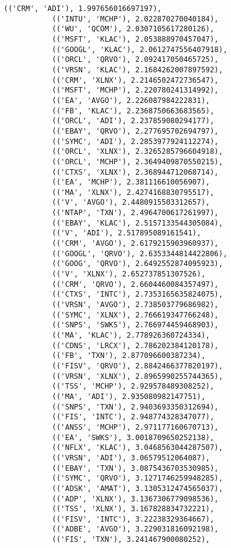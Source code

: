 \documentclass[11pt]{article}
\begin{document}
\begin{Verbatim}[commandchars=\\\{\}]
           (('CRM', 'ADI'), 1.997656016697197),
           (('INTU', 'MCHP'), 2.022870270040184),
           (('WU', 'QCOM'), 2.0307105617280126),
           (('MSFT', 'KLAC'), 2.053888970457047),
           (('GOOGL', 'KLAC'), 2.0612747556407918),
           (('ORCL', 'QRVO'), 2.092417050465725),
           (('VRSN', 'KLAC'), 2.1684262007897592),
           (('CRM', 'XLNX'), 2.2146502472736547),
           (('MSFT', 'MCHP'), 2.220780241314992),
           (('EA', 'AVGO'), 2.226087984222831),
           (('FB', 'KLAC'), 2.2368750663683565),
           (('ORCL', 'ADI'), 2.237859080294177),
           (('EBAY', 'QRVO'), 2.277695702694797),
           (('SYMC', 'ADI'), 2.2853977924112274),
           (('ORCL', 'XLNX'), 2.3265285796604918),
           (('ORCL', 'MCHP'), 2.3649409870550215),
           (('CTXS', 'XLNX'), 2.368944712068714),
           (('EA', 'MCHP'), 2.381116610056907),
           (('MA', 'XLNX'), 2.4274168830795517),
           (('V', 'AVGO'), 2.4480915503312657),
           (('NTAP', 'TXN'), 2.4964700617261997),
           (('EBAY', 'KLAC'), 2.5157133544305084),
           (('V', 'ADI'), 2.517895089161541),
           (('CRM', 'AVGO'), 2.6179215903960937),
           (('GOOGL', 'QRVO'), 2.6353344814422806),
           (('GOOG', 'QRVO'), 2.6492552874095923),
           (('V', 'XLNX'), 2.652737851307526),
           (('CRM', 'QRVO'), 2.6604460084357497),
           (('CTXS', 'INTC'), 2.7353165635824075),
           (('VRSN', 'AVGO'), 2.738503779686982),
           (('SYMC', 'XLNX'), 2.766619347766248),
           (('SNPS', 'SWKS'), 2.766974459468903),
           (('MA', 'KLAC'), 2.778926360724334),
           (('CDNS', 'LRCX'), 2.786202384120178),
           (('FB', 'TXN'), 2.877096600387234),
           (('FISV', 'QRVO'), 2.8842466377820197),
           (('VRSN', 'XLNX'), 2.8965990255744365),
           (('TSS', 'MCHP'), 2.929578489308252),
           (('MA', 'ADI'), 2.935080982147751),
           (('SNPS', 'TXN'), 2.9403693350312694),
           (('FIS', 'INTC'), 2.948774328347077),
           (('ANSS', 'MCHP'), 2.971177160670713),
           (('EA', 'SWKS'), 3.0018709650252138),
           (('NFLX', 'KLAC'), 3.0468563044287507),
           (('VRSN', 'ADI'), 3.06579512064087),
           (('EBAY', 'TXN'), 3.0875436703530985),
           (('SYMC', 'QRVO'), 3.1271746259948285),
           (('ADSK', 'AMAT'), 3.1305312474565037),
           (('ADP', 'XLNX'), 3.1367306779098536),
           (('TSS', 'XLNX'), 3.167828834732221),
           (('FISV', 'INTC'), 3.22238329364667),
           (('ADBE', 'AVGO'), 3.229031816092198),
           (('FIS', 'TXN'), 3.241467900080252),

\end{Verbatim}
\end{document}
